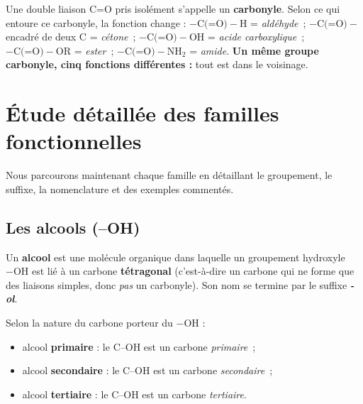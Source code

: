 \documentclass[11pt,a4paper]{article}
\begin{document}
\begin{remarque}
Une double liaison C=O pris isolément s'appelle un \textbf{carbonyle}. Selon ce qui entoure ce carbonyle, la fonction change : $-\text{C(=O)}-\text{H}$ = \emph{aldéhyde}~; $-\text{C(=O)}-$ encadré de deux C = \emph{cétone}~; $-\text{C(=O)}-\text{OH}$ = \emph{acide carboxylique}~; $-\text{C(=O)}-\text{OR}$ = \emph{ester}~; $-\text{C(=O)}-\text{NH}_2$ = \emph{amide}. \textbf{Un même groupe carbonyle, cinq fonctions différentes :} tout est dans le voisinage.
\end{remarque}

\section{Étude détaillée des familles fonctionnelles}
Nous parcourons maintenant chaque famille en détaillant le groupement, le suffixe, la nomenclature et des exemples commentés.

\subsection{Les alcools (--OH)}
\begin{definition}[Alcool]
Un \textbf{alcool} est une molécule organique dans laquelle un groupement hydroxyle $-\text{OH}$ est lié à un carbone \textbf{tétragonal} (c'est-à-dire un carbone qui ne forme que des liaisons simples, donc \emph{pas} un carbonyle). Son nom se termine par le suffixe \textbf{\textit{-ol}}.
\end{definition}

\begin{regle}
Selon la nature du carbone porteur du $-\text{OH}$ :
\begin{itemize}[leftmargin=1.6em,itemsep=1pt]
  \item alcool \textbf{primaire} : le C--OH est un carbone \emph{primaire}~;
  \item alcool \textbf{secondaire} : le C--OH est un carbone \emph{secondaire}~;
  \item alcool \textbf{tertiaire} : le C--OH est un carbone \emph{tertiaire}.
\end{itemize}
\end{regle}
\end{document}

